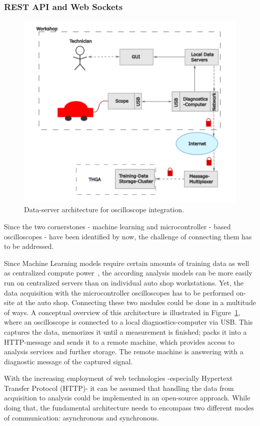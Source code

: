 \documentclass[conference,a4paper]{IEEEtran}
\begin{document}
\subsubsection{REST API and Web Sockets}
\begin{figure}[ht]
  \centering
  \includegraphics[width=0.9\linewidth]{figures/architecture.png}
  \caption{Data-server architecture for oscilloscope integration.}
  \label{fig:data-server}
\end{figure}
Since the two cornerstones - machine learning and microcontroller - based oscilloscopes - have been identified by now, the challenge of connecting them has to be addressed.

Since Machine Learning models require certain amounts of training data as well as centralized compute power~\cite{Verbraeken2020DMLS}, 
the according analysis models can be more easily run on centralized servers than on individual auto shop workstations. 
Yet, the data acquisition with the microcontroller oscilloscopes has to be performed on-site at the auto shop. 
Connecting these two modules could be done in a multitude of ways. 
A conceptual overview of this architecture is illustrated in Figure~\ref{fig:data-server}, where an oscilloscope is connected to a local diagnostics-computer via USB.
This captures the data, memorizes it until a measurement is finished; packs it into a HTTP-message and sends it to a remote machine, which provides access to analysis services and further storage.
The remote machine is answering with a diagnostic message of the captured signal.

With the increasing employment of web technologies -especially Hypertext Transfer Protocol (HTTP)- it can be assumed that handling the data from acquisition to analysis could be implemented in an open-source approach. 
While doing that, the fundamental architecture needs to encompass two different modes of communication: asynchronous and synchronous.
\end{document}
